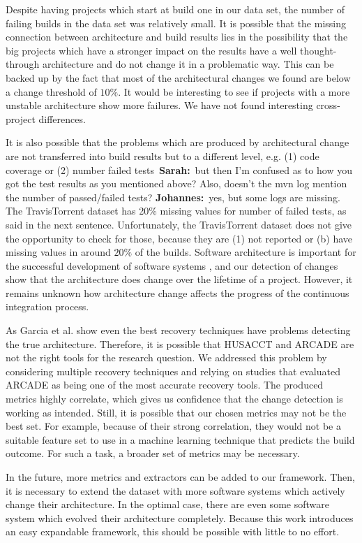 \documentclass[sigplan, anonymous, review]{acmart}
\newcommand{\sn}[1]{{\color{blue}\textbf{Sarah:}~#1}}
\newcommand{\jk}[1]{{\color{violet}\textbf{Johannes:}~#1}}
\begin{document}
Despite having projects which start at build one in our data set, the number of failing builds in the data set was relatively small. 
It is possible that the missing connection between architecture and build results lies in the possibility that the big projects which have a stronger impact on the results have a well thought-through architecture and do not change it in a problematic way.
This can be backed up by the fact that most of the architectural changes we found are below a change threshold of $10\%$. It would be interesting to see if projects with a more unstable architecture show more failures. We have not found interesting cross-project differences.

It is also possible that the problems which are produced by architectural change are not transferred into build results but to a different level, e.g. (1) code coverage or (2) number failed tests~\sn{but then I'm confused as to how you got the test results as you mentioned above? Also, doesn't the mvn log mention the number of passed/failed tests?} \jk{yes, but some logs are missing. The TravisTorrent dataset has 20\% missing values for number of failed tests, as said in the next sentence}. Unfortunately, the TravisTorrent dataset does not give the opportunity to check for those, because they are (1) not reported or (b) have missing values in around $20\%$ of the builds. Software architecture is important for the successful development of software systems \cite{ADLs1}, and our detection of changes show that the architecture does change over the lifetime of a project. However, it remains unknown how architecture change affects the progress of the continuous integration process.

As Garcia et al. \cite{arcRec-comparison} show even the best recovery techniques have problems detecting the true architecture. Therefore, it is possible that HUSACCT and ARCADE are not the right tools for the research question. We addressed this problem by considering multiple recovery techniques and relying on studies that evaluated ARCADE as being one of the most accurate recovery tools. The produced metrics highly correlate, which gives us confidence that the change detection is working as intended. Still, it is possible that our chosen metrics may not be the best set. For example, because of their strong correlation, they would not be a suitable feature set to use in a machine learning technique that predicts the build outcome. For such a task, a broader set of metrics may be necessary. 

In the future, more metrics and extractors can be added to our framework.  
Then, it is necessary to extend the dataset with more software systems which actively change their architecture. In the optimal case, there are even some software system which evolved their architecture completely. 
Because this work introduces an easy expandable framework, this should be possible with little to no effort.
\end{document}
